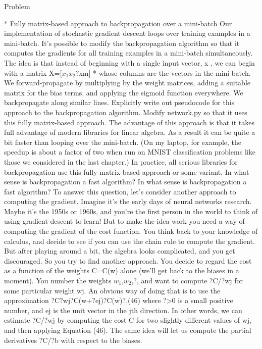 Problem

* Fully matrix-based approach to backpropagation over a mini-batch Our implementation of stochastic gradient descent loops over training examples in a mini-batch. It's possible to modify the backpropagation algorithm so that it computes the gradients for all training examples in a mini-batch simultaneously. The idea is that instead of beginning with a single input vector, x
, we can begin with a matrix X=[$x_1$$x_2$?xm]
* whose columns are the vectors in the mini-batch. We forward-propagate by multiplying by the weight matrices, adding a suitable matrix for the bias terms, and applying the sigmoid function everywhere. We backpropagate along similar lines. Explicitly write out pseudocode for this approach to the backpropagation algorithm. Modify network.py so that it uses this fully matrix-based approach. The advantage of this approach is that it takes full advantage of modern libraries for linear algebra. As a result it can be quite a bit faster than looping over the mini-batch. (On my laptop, for example, the speedup is about a factor of two when run on MNIST classification problems like those we considered in the last chapter.) In practice, all serious libraries for backpropagation use this fully matrix-based approach or some variant. 
In what sense is backpropagation a fast algorithm?
In what sense is backpropagation a fast algorithm? To answer this question, let's consider another approach to computing the gradient. Imagine it's the early days of neural networks research. Maybe it's the 1950s or 1960s, and you're the first person in the world to think of using gradient descent to learn! But to make the idea work you need a way of computing the gradient of the cost function. You think back to your knowledge of calculus, and decide to see if you can use the chain rule to compute the gradient. But after playing around a bit, the algebra looks complicated, and you get discouraged. So you try to find another approach. You decide to regard the cost as a function of the weights C=C(w)
alone (we'll get back to the biases in a moment). You number the weights $w_1$,$w_2$,?, and want to compute ?C/?wj for some particular weight wj. An obvious way of doing that is to use the approximation 
?C?wj?C(w+?ej)?C(w)?,(46)
where ?>0 is a small positive number, and ej is the unit vector in the jth direction. In other words, we can estimate ?C/?wj by computing the cost C for two slightly different values of wj, and then applying Equation (46). The same idea will let us compute the partial derivatives ?C/?b
with respect to the biases.
$$

